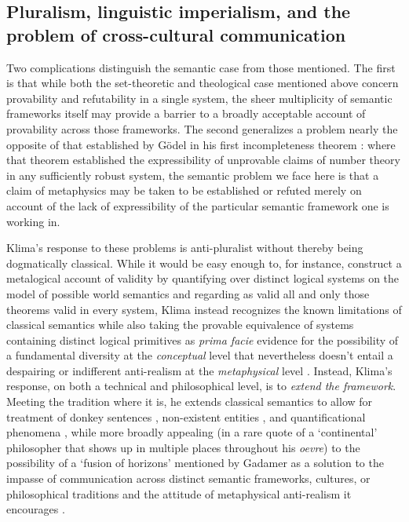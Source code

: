 \documentclass[]{article}
\begin{document}
\subsection{Pluralism, linguistic imperialism, and the problem of cross-cultural communication}
Two complications distinguish the semantic case from those mentioned. 
The first is that while both the set-theoretic and theological case mentioned above concern provability and refutability in a single system, 
the sheer multiplicity of semantic frameworks itself may provide a barrier to a broadly acceptable account of provability across those frameworks. 
The second generalizes a problem nearly the opposite of that established by G\"{o}del in his first incompleteness theorem \autocite{Godel1931}:
where that theorem established the expressibility of unprovable claims of number theory in any sufficiently robust system, 
the semantic problem we face here is that a claim of metaphysics may be taken to be established or refuted merely on account of the lack of expressibility of the particular semantic framework one is working in. 

Klima's response to these problems is anti-pluralist 
without thereby being dogmatically classical. 
While it would be easy enough to, for instance, 
construct a metalogical account of validity by quantifying over distinct logical systems on the model of possible world semantics and regarding as valid all and only those theorems valid in every system, 
Klima instead recognizes the known limitations of classical semantics 
while also taking the provable equivalence of systems containing distinct logical primitives
as \emph{prima facie} evidence for the possibility of a fundamental diversity at the \emph{conceptual} level 
that nevertheless doesn't entail a despairing or indifferent anti-realism at the \emph{metaphysical} level \autocite{Klima2012}.
Instead, 
Klima's response, 
on both a technical and philosophical level, 
is to \emph{extend the framework}. 
Meeting the tradition where it is, he extends classical semantics to allow for treatment of 
donkey sentences \autocite{Klima1988,Klima2010}, 
non-existent entities \autocite{Klima2001}, 
and quantificational phenomena \autocite{KlimaSandu1990},
while more broadly appealing (in a rare quote of a `continental' philosopher that shows up in multiple places throughout his \emph{oevre}) 
to the possibility of a `fusion of horizons' mentioned by Gadamer 
as a solution to the impasse of communication across distinct semantic frameworks, cultures, or philosophical traditions 
and the attitude of metaphysical anti-realism it encourages \autocite{Klima2000,Klima2009a}.
\end{document}
